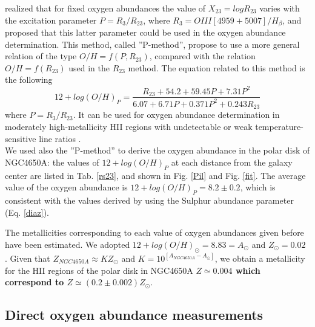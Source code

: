 \documentclass[12pt,preprint]{aastex}
\begin{document}
\citet{Pil01} realized that for fixed oxygen abundances the value
of $X_{23} = log R_{23}$ varies with the excitation parameter $P =
R_{3}/R_{23}$, where $R_{3} = OIII[4959+5007]/H_{\beta}$, and proposed
that this latter parameter could be used in the oxygen abundance
determination. This method, called ''P-method'', propose to use a more
general relation of the type $O/H = f(P, R_{23})$, compared with the
relation $O/H = f(R_{23})$ used in the $R_{23}$ method. The equation
related to this method is the following
\begin{equation}\label{pil_cal}
    12+log(O/H)_{P} = \frac{R_{23}+54.2+59.45P+7.31P^{2}}{6.07+6.71P+0.371P^{2}+0.243R_{23}}
\end{equation}
where $P = R_{3}/R_{23}$. It can be used for oxygen abundance
determination in moderately high-metallicity HII regions with
undetectable or weak temperature-sensitive line ratios
\citep{Pil01}.\\ We used also the ''P-method'' to derive the oxygen
abundance in the polar disk of NGC4650A: the values of
$12+log(O/H)_{P}$ at each distance from the galaxy center are listed
in Tab. \ref{rs23}, and shown in Fig. \ref{Pil} and Fig. \ref{fit}. The
average value of the oxygen abundance is $12+log(O/H)_{P} = 8.2 \pm
0.2$, which is consistent with the values derived by using the Sulphur
abundance parameter (Eq. \ref{diaz}).

The metallicities corresponding to each value of oxygen abundances
given before have been estimated. We adopted $12 + log(O/H)_{\odot} =
8.83 = A_{\odot}$ and $Z_{\odot} = 0.02$ \citep{Asp04}. Given that
$Z_{NGC4650A} \approx K Z_{\odot}$ and $K = 10^{[A_{NGC4650A} -
A_{\odot}]}$, we obtain a metallicity for the HII regions of the polar
disk in NGC4650A {\bf $Z \simeq 0.004$ which correspond to $Z \simeq
(0.2 \pm 0.002) Z_{\odot}$}.


\subsection{Direct oxygen abundance measurements}\label{dir}
\end{document}
